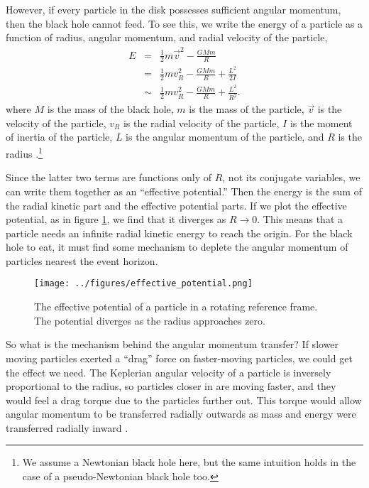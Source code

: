 \documentclass[]{article}
\newcommand{\myvec}[1]{\vec{#1}} %
\begin{document}
However, if every particle in the disk possesses sufficient angular
momentum, then the black hole cannot feed. To see this, we write the
energy of a particle as a function of radius, angular momentum, and
radial velocity of the particle,
\begin{eqnarray}
  \label{eq:energy:particle}
  E &=& \frac{1}{2}m\myvec{v}^2 - \frac{G M m}{R}\\
  &=& \frac{1}{2}m v_R^2 - \frac{G M m}{R} + \frac{L^2}{2I}\\
  &\sim& \frac{1}{2}m v_R^2 - \frac{G M m}{R} + \frac{L^2}{R^2}.
\end{eqnarray}
where $M$ is the mass of the black hole, $m$ is the mass of the
particle, $\myvec{v}$ is the velocity of the particle, $v_R$ is the
radial velocity of the particle, $I$ is the moment of inertia of the
particle, $L$ is the angular momentum of the particle, and $R$ is the
radius \cite{ThortonMarion}.\footnote{We assume a Newtonian black hole
  here, but the same intuition holds in the case of a pseudo-Newtonian
  black hole too.}

Since the latter two terms are functions only of $R$, not its
conjugate variables, we can write them together as an ``effective
potential.'' Then the energy is the sum of the radial kinetic part and
the effective potential parts. If we plot the effective potential, as
in figure \ref{fig:effective:potential}, we find that it diverges as
$R\to 0$. This means that a particle needs an infinite radial kinetic
energy to reach the origin. For the black hole to eat, it must find
some mechanism to deplete the angular momentum of particles nearest
the event horizon.

\begin{figure}[htb]
  \begin{center}
    \leavevmode
    \texttt{[image: ../figures/effective\_potential.png]}
    \caption[The effective potential of a particle in a rotating
    reference frame]{The effective potential of a particle in a
      rotating reference frame. The potential diverges as the radius
      approaches zero.}
      \label{fig:effective:potential}
  \end{center}
\end{figure}

So what is the mechanism behind the angular momentum transfer? If
slower moving particles exerted a ``drag'' force on faster-moving
particles, we could get the effect we need. The Keplerian angular
velocity of a particle is inversely proportional to the radius, so
particles closer in are moving faster, and they would feel a drag
torque due to the particles further out. This torque would allow
angular momentum to be transferred radially outwards as mass and
energy were transferred radially inward
\cite{Frank,Melia,ShakuraSunyaev73}.
\end{document}

